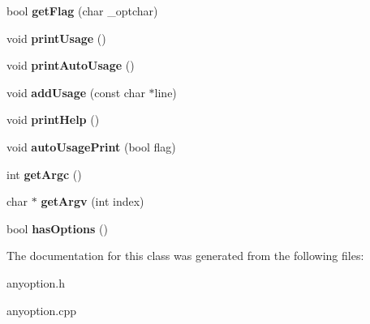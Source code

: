 \begin{DoxyCompactItemize}
\item 
\hypertarget{class_any_option_a955d685485036fabc3cedde66f441978}{bool {\bfseries get\-Flag} (char \-\_\-optchar)}\label{class_any_option_a955d685485036fabc3cedde66f441978}

\item 
\hypertarget{class_any_option_a27d72b5ea4ab75eaeb74207b2165b1fe}{void {\bfseries print\-Usage} ()}\label{class_any_option_a27d72b5ea4ab75eaeb74207b2165b1fe}

\item 
\hypertarget{class_any_option_a531b07829ead5a4a292ff2f0b3be8f9a}{void {\bfseries print\-Auto\-Usage} ()}\label{class_any_option_a531b07829ead5a4a292ff2f0b3be8f9a}

\item 
\hypertarget{class_any_option_ad0c5643f303324e20754455d58ff2ff0}{void {\bfseries add\-Usage} (const char $\ast$line)}\label{class_any_option_ad0c5643f303324e20754455d58ff2ff0}

\item 
\hypertarget{class_any_option_ad10117aa56fe321efbbf0b90bc6ca124}{void {\bfseries print\-Help} ()}\label{class_any_option_ad10117aa56fe321efbbf0b90bc6ca124}

\item 
\hypertarget{class_any_option_ab41d990eb6cbe95fbab17e4f961fb365}{void {\bfseries auto\-Usage\-Print} (bool flag)}\label{class_any_option_ab41d990eb6cbe95fbab17e4f961fb365}

\item 
\hypertarget{class_any_option_a59fd57b36dc2626d49926e7424d5b695}{int {\bfseries get\-Argc} ()}\label{class_any_option_a59fd57b36dc2626d49926e7424d5b695}

\item 
\hypertarget{class_any_option_acd1e384bfe595be9e4b8cd27cf400643}{char $\ast$ {\bfseries get\-Argv} (int index)}\label{class_any_option_acd1e384bfe595be9e4b8cd27cf400643}

\item 
\hypertarget{class_any_option_aefa633ab31303cbe67bc6b3b501649f4}{bool {\bfseries has\-Options} ()}\label{class_any_option_aefa633ab31303cbe67bc6b3b501649f4}

\end{DoxyCompactItemize}


The documentation for this class was generated from the following files\-:\begin{DoxyCompactItemize}
\item 
anyoption.\-h\item 
anyoption.\-cpp\end{DoxyCompactItemize}

